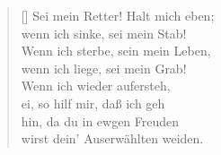 \begin{multicols}{2}
\begin{verse}[\versewidth]
 Sei mein Retter! Halt mich eben;\\
wenn ich sinke, sei mein Stab!\\
Wenn ich sterbe, sein mein Leben,\\
wenn ich liege, sei mein Grab!\\
Wenn ich wieder aufersteh,\\
ei, so hilf mir, daß ich geh\\
hin, da du in ewgen Freuden\\
wirst dein' Auserwählten weiden.

\end{verse}
\end{multicols}
